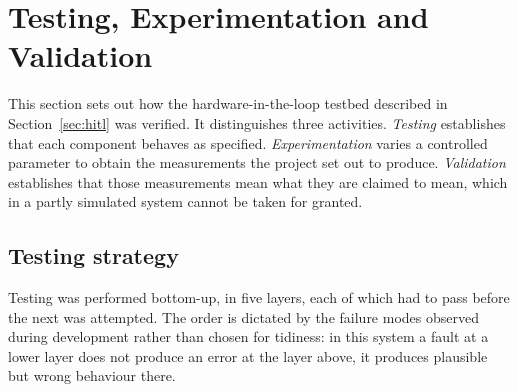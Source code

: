 %      
%
%
%
%

\newcommand{\pass}{\textsc{pass}}
\newcommand{\fail}{\textsc{fail}}

\section{Testing, Experimentation and Validation}
\label{sec:test}

This section sets out how the hardware-in-the-loop testbed described in
Section~\ref{sec:hitl} was verified. It distinguishes three activities.
\emph{Testing} establishes that each component behaves as specified.
\emph{Experimentation} varies a controlled parameter to obtain the
measurements the project set out to produce. \emph{Validation} establishes
that those measurements mean what they are claimed to mean, which in a
partly simulated system cannot be taken for granted.

\subsection{Testing strategy}
\label{sec:test-strategy}

Testing was performed bottom-up, in five layers, each of which had to pass
before the next was attempted. The order is dictated by the failure modes
observed during development rather than chosen for tidiness: in this system
a fault at a lower layer does not produce an error at the layer above, it
produces plausible but wrong behaviour there.

